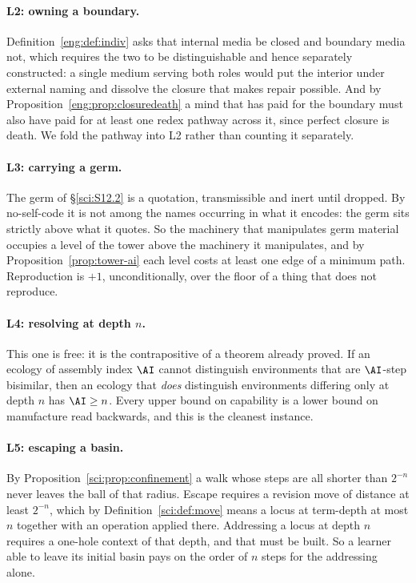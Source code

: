\paragraph{L2: owning a boundary.}
Definition~\ref{eng:def:indiv} asks that internal media be closed and
boundary media not, which requires the two to be distinguishable and hence
separately constructed: a single medium serving both roles would put the
interior under external naming and dissolve the closure that makes repair
possible. And by Proposition~\ref{eng:prop:closuredeath} a mind that has
paid for the boundary must also have paid for at least one redex pathway
across it, since perfect closure is death. We fold the pathway into L2
rather than counting it separately.

\paragraph{L3: carrying a germ.}
The germ of \S\ref{sci:S12.2} is a quotation, transmissible and inert
until dropped. By no-self-code it is not among the names occurring in what
it encodes: the germ sits strictly above what it quotes. So the machinery
that manipulates germ material occupies a level of the tower above the
machinery it manipulates, and by Proposition~\ref{prop:tower-ai} each
level costs at least one edge of a minimum path. Reproduction is $+1$,
unconditionally, over the floor of a thing that does not reproduce.

\paragraph{L4: resolving at depth $n$.}
This one is free: it is the contrapositive of a theorem already proved. If
an ecology of assembly index $\AI$ cannot distinguish environments that
are $\AI$-step bisimilar, then an ecology that \emph{does} distinguish
environments differing only at depth $n$ has $\AI \ge n$. Every upper
bound on capability is a lower bound on manufacture read backwards, and
this is the cleanest instance.

\paragraph{L5: escaping a basin.}
By Proposition~\ref{sci:prop:confinement} a walk whose steps are all
shorter than $2^{-n}$ never leaves the ball of that radius. Escape
requires a revision move of distance at least $2^{-n}$, which by
Definition~\ref{sci:def:move} means a locus at term-depth at most $n$
together with an operation applied there. Addressing a locus at depth $n$
requires a one-hole context of that depth, and that must be built. So a
learner able to leave its initial basin pays on the order of $n$ steps for
the addressing alone.

